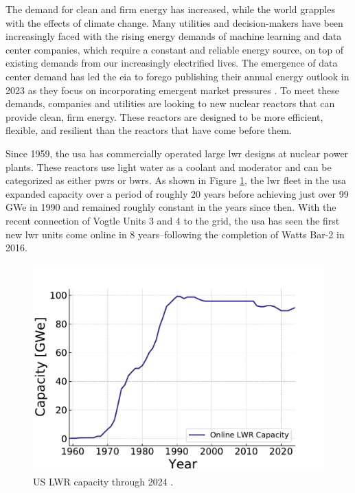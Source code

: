 The demand for clean and firm energy has increased, while the world grapples
with the effects of climate change. Many utilities and decision-makers have
been increasingly faced with the rising energy demands of machine learning and
data center companies, which require a constant and reliable energy source, on
top of existing demands from our increasingly electrified lives. The emergence
of data center demand has led the \gls{eia} to forego publishing their annual
energy outlook in 2023 as they focus on incorporating emergent market pressures
\cite{eia_annual_outlook_canceled_2023}. To meet these demands, companies and
utilities are looking to new nuclear reactors that can provide clean, firm
energy. These reactors are designed to be more efficient, flexible, and
resilient than the reactors that have come before them.

Since 1959, the \gls{usa} has commercially operated large \gls{lwr} designs at
nuclear power plants. These reactors use light water as a coolant and moderator
and can be categorized as either \glspl{pwr} or \glspl{bwr}. As shown in Figure
\ref{fig:online_lwr_cap_2024}, the \gls{lwr} fleet in the \gls{usa} expanded
capacity over a period of roughly 20 years before achieving just over 99 GWe in
1990 and remained roughly constant in the years since then. With the recent
connection of Vogtle Units 3 and 4 to the grid, the \gls{usa} has seen the
first new \gls{lwr} units come online in 8 years--following the completion of
Watts Bar-2 in 2016.

\begin{figure}[H]
    \centering
    \includegraphics[scale=0.7]{images/intro/online_lwr_cap_2024.pdf}
    \caption{US LWR capacity through 2024 \cite{IAEA_PRIS}.}
    \label{fig:online_lwr_cap_2024}
\end{figure}

